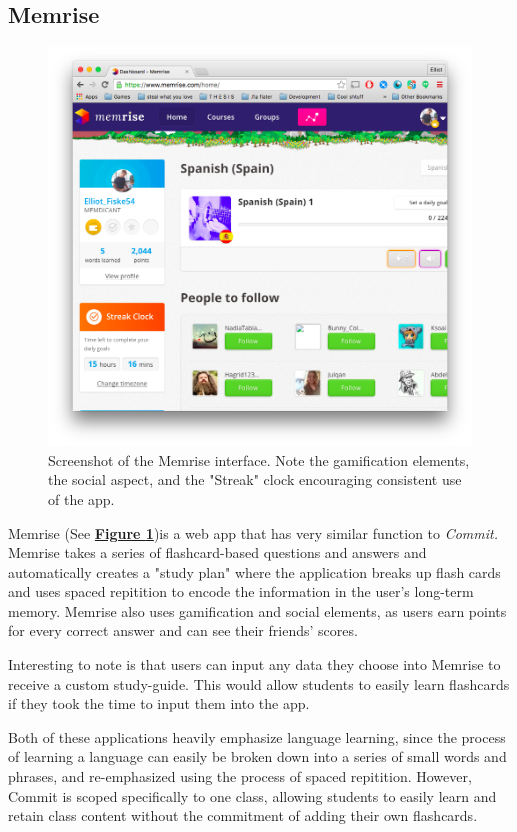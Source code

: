 \subsection{Memrise}

\begin{figure}
	\centering
	\includegraphics[width=0.7\linewidth]{memrise}
	\caption[Memrise]{Screenshot of the Memrise interface. Note the gamification elements, the social aspect, and the "Streak" clock encouraging consistent use of the app.}
	\label{fig:memrise}
\end{figure}

\par Memrise (See \textbf{\hyperref[fig:memrise]{Figure \ref*{fig:memrise}}})is a web app that has very similar function to \textit{Commit.} Memrise takes a series of flashcard-based questions and answers and automatically creates a "study plan" where the application breaks up flash cards and uses spaced repitition to encode the information in the user's long-term memory. Memrise also uses gamification and social elements, as users earn points for every correct answer and can see their friends' scores.

\par Interesting to note is that users can input any data they choose into Memrise to receive a custom study-guide. This would allow students to easily learn flashcards if they took the time to input them into the app.

\par Both of these applications heavily emphasize language learning, since the process of learning a language can easily be broken down into a series of small words and phrases, and re-emphasized using the process of spaced repitition. However, Commit is scoped specifically to one class, allowing students to easily learn and retain class content without the commitment of adding their own flashcards.